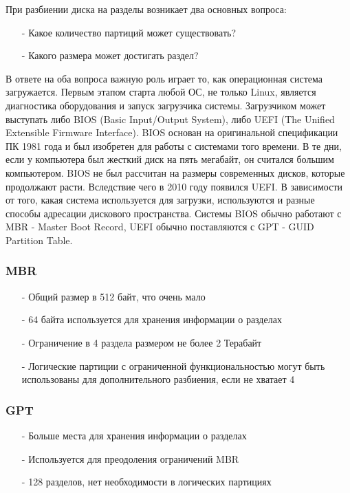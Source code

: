 \documentclass[14pt, a4paper]{article}
\begin{document}
При разбиении диска на разделы возникает два основных вопроса:
\begin{itemize}
    \item[-] Какое количество партиций может существовать?
    \item[-] Какого размера может достигать раздел?
\end{itemize}

В ответе на оба вопроса важную роль играет то, как операционная система загружается. Первым
этапом старта любой ОС, не только Linux, является диагностика оборудования и запуск загрузчика
системы. Загрузчиком может выступать либо BIOS (Basic Input/Output System), либо UEFI (The Unified
Extensible Firmware Interface). BIOS основан на оригинальной спецификации ПК 1981 года и был
изобретен для работы с системами того времени. В те дни, если у компьютера был жесткий диск на
пять мегабайт, он считался большим компьютером. BIOS не был рассчитан на размеры современных
дисков, которые продолжают расти. Вследствие чего в 2010 году появился UEFI. В зависимости от
того, какая система используется для загрузки, используются и разные способы адресации дискового
пространства. Системы BIOS обычно работают с MBR - Master Boot Record, UEFI обычно
поставляются с GPT - GUID Partition Table.

\subsubsection*{MBR} 

\begin{itemize}
    \item[-] Общий размер в 512 байт, что очень мало
    \item[-] 64 байта используется для хранения информации о разделах
    \item[-] Ограничение в 4 раздела размером не более 2 Терабайт
    \item[-] Логические партиции с ограниченной функциональностью могут быть использованы для
    дополнительного разбиения, если не хватает 4
\end{itemize}

\subsubsection*{GPT} 

\begin{itemize}
    \item[-] Больше места для хранения информации о разделах
    \item[-] Используется для преодоления ограничений MBR
    \item[-] 128 разделов, нет необходимости в логических партициях
\end{itemize}
\end{document}
